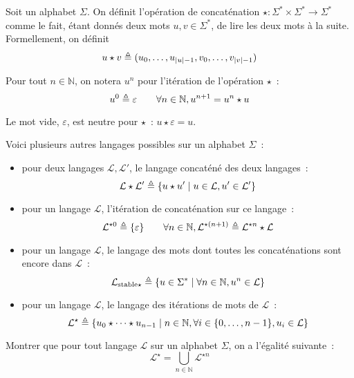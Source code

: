 \begin{definition}[Concaténation]
  Soit un alphabet $\Sigma$. On définit l'opération de concaténation
  $\star : \Sigma^*\times\Sigma^*\to\Sigma^*$ comme le fait, étant donnés deux
  mots $u,v\in\Sigma^*$, de lire les deux mots à la suite. Formellement, on
  définit
  \[u\star v \triangleq (u_0,\ldots,u_{|u|-1},v_0,\ldots,v_{|v|-1})\]

  Pour tout $n\in \mathbb N$, on notera $u^n$ pour l'itération de l'opération
  $\star$~:
  \[u^0 \triangleq \varepsilon \qquad
  \forall n \in \mathbb N, u^{n+1} = u^n \star u\]
\end{definition}

\begin{remark}
  Le mot vide, $\varepsilon$, est neutre pour $\star$~: $u\star\varepsilon = u$.
\end{remark}

\begin{example}
  Voici plusieurs autres langages possibles sur un alphabet $\Sigma$~:
  \begin{itemize}
  \item pour deux langages $\mathcal L, \mathcal L'$, le langage concaténé des
    deux langages~:
    \[\mathcal L\star\mathcal L'\triangleq
    \{u\star u'\mid u \in \mathcal L, u' \in \mathcal L' \}\]
  \item pour un langage $\mathcal L$, l'itération de concaténation sur ce
    langage~:
    \[\mathcal L^{\star 0} \triangleq \{\varepsilon\}\qquad
    \forall n \in \mathbb N, \mathcal L^{\star(n+1)} \triangleq
    \mathcal L^{\star n}\star\mathcal L\]
  \item pour un langage $\mathcal L$, le langage des mots dont toutes les
    concaténations sont encore dans $\mathcal L$~:
    \[\mathcal L_{\mathrm{stable}\star}\triangleq
    \{u\in \Sigma^*\mid \forall n \in \mathbb N, u^n \in \mathcal L\}\]
  \item pour un langage $\mathcal L$, le langage des itérations de mots de
    $\mathcal L$~:
    \[\mathcal L^\star \triangleq
    \{u_0\star\cdots\star u_{n-1}\mid
    n \in \mathbb N, \forall i\in \{0,\ldots,n -1\}, u_i \in \mathcal L\}\]
  \end{itemize}
\end{example}

\begin{exercise}
  Montrer que pour tout langage $\mathcal L$ sur un alphabet $\Sigma$, on a
  l'égalité suivante~:
  \[\mathcal L^\star = \bigcup_{n \in \mathbb N} \mathcal L^{\star n}\]
\end{exercise}

